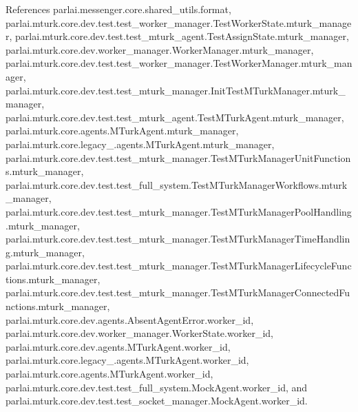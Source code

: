 References parlai.\+messenger.\+core.\+shared\+\_\+utils.\+format, parlai.\+mturk.\+core.\+dev.\+test.\+test\+\_\+worker\+\_\+manager.\+Test\+Worker\+State.\+mturk\+\_\+manager, parlai.\+mturk.\+core.\+dev.\+test.\+test\+\_\+mturk\+\_\+agent.\+Test\+Assign\+State.\+mturk\+\_\+manager, parlai.\+mturk.\+core.\+dev.\+worker\+\_\+manager.\+Worker\+Manager.\+mturk\+\_\+manager, parlai.\+mturk.\+core.\+dev.\+test.\+test\+\_\+worker\+\_\+manager.\+Test\+Worker\+Manager.\+mturk\+\_\+manager, parlai.\+mturk.\+core.\+dev.\+test.\+test\+\_\+mturk\+\_\+manager.\+Init\+Test\+M\+Turk\+Manager.\+mturk\+\_\+manager, parlai.\+mturk.\+core.\+dev.\+test.\+test\+\_\+mturk\+\_\+agent.\+Test\+M\+Turk\+Agent.\+mturk\+\_\+manager, parlai.\+mturk.\+core.\+agents.\+M\+Turk\+Agent.\+mturk\+\_\+manager, parlai.\+mturk.\+core.\+legacy\+\_.\+agents.\+M\+Turk\+Agent.\+mturk\+\_\+manager, parlai.\+mturk.\+core.\+dev.\+test.\+test\+\_\+mturk\+\_\+manager.\+Test\+M\+Turk\+Manager\+Unit\+Functions.\+mturk\+\_\+manager, parlai.\+mturk.\+core.\+dev.\+test.\+test\+\_\+full\+\_\+system.\+Test\+M\+Turk\+Manager\+Workflows.\+mturk\+\_\+manager, parlai.\+mturk.\+core.\+dev.\+test.\+test\+\_\+mturk\+\_\+manager.\+Test\+M\+Turk\+Manager\+Pool\+Handling.\+mturk\+\_\+manager, parlai.\+mturk.\+core.\+dev.\+test.\+test\+\_\+mturk\+\_\+manager.\+Test\+M\+Turk\+Manager\+Time\+Handling.\+mturk\+\_\+manager, parlai.\+mturk.\+core.\+dev.\+test.\+test\+\_\+mturk\+\_\+manager.\+Test\+M\+Turk\+Manager\+Lifecycle\+Functions.\+mturk\+\_\+manager, parlai.\+mturk.\+core.\+dev.\+test.\+test\+\_\+mturk\+\_\+manager.\+Test\+M\+Turk\+Manager\+Connected\+Functions.\+mturk\+\_\+manager, parlai.\+mturk.\+core.\+dev.\+agents.\+Absent\+Agent\+Error.\+worker\+\_\+id, parlai.\+mturk.\+core.\+dev.\+worker\+\_\+manager.\+Worker\+State.\+worker\+\_\+id, parlai.\+mturk.\+core.\+dev.\+agents.\+M\+Turk\+Agent.\+worker\+\_\+id, parlai.\+mturk.\+core.\+legacy\+\_.\+agents.\+M\+Turk\+Agent.\+worker\+\_\+id, parlai.\+mturk.\+core.\+agents.\+M\+Turk\+Agent.\+worker\+\_\+id, parlai.\+mturk.\+core.\+dev.\+test.\+test\+\_\+full\+\_\+system.\+Mock\+Agent.\+worker\+\_\+id, and parlai.\+mturk.\+core.\+dev.\+test.\+test\+\_\+socket\+\_\+manager.\+Mock\+Agent.\+worker\+\_\+id.

\mbox{\label{classparlai_1_1mturk_1_1core_1_1legacy__2018_1_1agents_1_1MTurkAgent_a2b5555ed1e85ef49d26d38b177052eb1}} 

